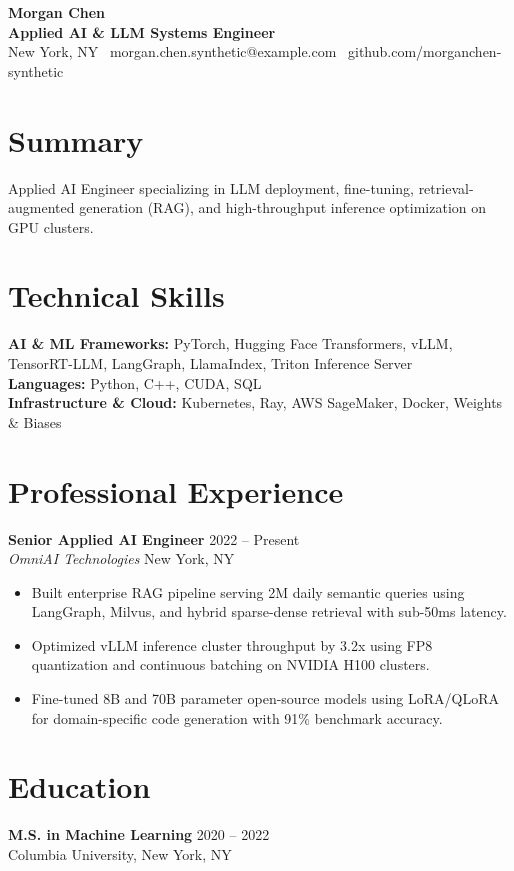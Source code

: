 \documentclass[11pt,a4paper]{article}
\begin{document}
\begin{center}
    {\LARGE \textbf{Morgan Chen}} \\
    \vspace{2pt}
    \textbf{Applied AI \& LLM Systems Engineer} \\
    New York, NY \textbar\ morgan.chen.synthetic@example.com \textbar\ github.com/morganchen-synthetic
\end{center}

\section*{Summary}
Applied AI Engineer specializing in LLM deployment, fine-tuning, retrieval-augmented generation (RAG), and high-throughput inference optimization on GPU clusters.

\section*{Technical Skills}
\textbf{AI \& ML Frameworks:} PyTorch, Hugging Face Transformers, vLLM, TensorRT-LLM, LangGraph, LlamaIndex, Triton Inference Server \\
\textbf{Languages:} Python, C++, CUDA, SQL \\
\textbf{Infrastructure \& Cloud:} Kubernetes, Ray, AWS SageMaker, Docker, Weights \& Biases

\section*{Professional Experience}
\textbf{Senior Applied AI Engineer} \hfill 2022 -- Present \\
\textit{OmniAI Technologies} \hfill New York, NY
\begin{itemize}
    \item Built enterprise RAG pipeline serving 2M daily semantic queries using LangGraph, Milvus, and hybrid sparse-dense retrieval with sub-50ms latency.
    \item Optimized vLLM inference cluster throughput by 3.2x using FP8 quantization and continuous batching on NVIDIA H100 clusters.
    \item Fine-tuned 8B and 70B parameter open-source models using LoRA/QLoRA for domain-specific code generation with 91\% benchmark accuracy.
\end{itemize}

\section*{Education}
\textbf{M.S. in Machine Learning} \hfill 2020 -- 2022 \\
Columbia University, New York, NY
\end{document}
